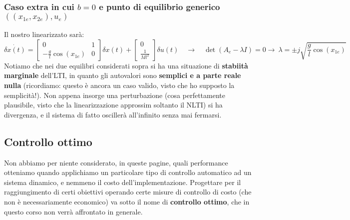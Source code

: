 \documentclass[a4paper]{report}
\begin{document}
\begin{esem}
\subsubsection{Caso extra in cui $b = 0$ e punto di equilibrio generico $((x_{1e},x_{2e}),u_e)$}
Il nostro linearizzato sarà:
\begin{equation*}
	\dot{\delta x(t)} = \begin{bmatrix}
 0 & 1 \\ -\frac{g}{l}\cos(x_{1e}) & 0	
 \end{bmatrix} \delta x(t) + \begin{bmatrix}
 	0 \\ \frac{1}{Ml^2}
 \end{bmatrix} \delta u(t) \quad \rightarrow \quad 
	\det(A_e - \lambda I) = 0 \rightarrow \ \lambda = \pm j \sqrt{\frac{g}{l}  \cos(x_{1e})} 
\end{equation*}
Notiamo che nei due equilibri considerati sopra si ha una situazione di \textbf{stabiità marginale} dell'LTI, in quanto gli autovalori sono \textbf{semplici e a parte reale nulla} (ricordiamo: questo è ancora un caso valido, visto che ho supposto la semplicità!). Non appena insorge una perturbazione (cosa perfettamente plausibile, visto che la linearizzazione approssim soltanto il NLTI) si ha divergenza, e il sistema di fatto oscillerà all'infinito senza mai fermarsi. 
\end{esem}

\subsection{Controllo ottimo}
Non abbiamo per niente considerato, in queste pagine, quali performance otteniamo quando applichiamo un particolare tipo di controllo automatico ad un sistema dinamico, e nemmeno il costo dell'implementazione. Progettare per il raggiungimento di certi obiettivi operando certe misure di controllo di costo (che non è necessariamente economico) va sotto il nome di \textbf{controllo ottimo}, che in questo corso non verrà affrontato in generale.




\end{document}
